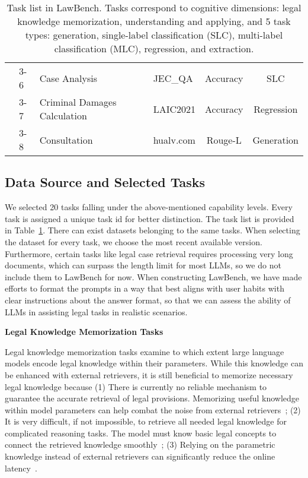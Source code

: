 \begin{table}[htbp]
{\begin{tabular}{llllcc}
          & 3-6 & Case Analysis & JEC\_QA & Accuracy &SLC\\
          & 3-7 & Criminal Damages Calculation & LAIC2021  & Accuracy &Regression \\
          & 3-8 & Consultation & hualv.com & Rouge-L &Generation\\
    \bottomrule
    \end{tabular}
    }
    \caption{\small Task list in LawBench. Tasks correspond to cognitive dimensions: legal knowledge memorization, understanding and applying, and 5 task types: generation, single-label classification (SLC), multi-label classification (MLC), regression, and extraction.}
  \label{tab:tasks}%
\end{table}%

\subsection{Data Source and Selected Tasks}
We selected 20 tasks falling under the above-mentioned capability levels. Every task is assigned a unique task id for better distinction. The task list is provided in Table~\ref{tab:tasks}. There can exist datasets belonging to the same tasks. When selecting the dataset for every task, we choose the most recent available version. Furthermore, certain tasks like legal case retrieval requires processing very long documents, which can surpass the length limit for most LLMs, so we do not include them to LawBench for now. When constructing LawBench, we have made efforts to format the prompts in a way that best aligns with user habits with clear instructions about the answer format, so that we can assess the ability of LLMs in assisting legal tasks in realistic scenarios.

\textbf{Legal Knowledge Memorization Tasks}

Legal knowledge memorization tasks examine to which extent large language models encode legal knowledge within their parameters. While this knowledge can be enhanced with external retrievers, it is still beneficial to memorize necessary legal knowledge because (1) There is currently no reliable mechanism to guarantee the accurate retrieval of legal provisions. Memorizing useful knowledge within model parameters can help combat the noise from external retrievers~\cite{xie2023adaptive,neeman2023disentqa}; (2) It is very difficult, if not impossible, to retrieve all needed legal knowledge for complicated reasoning tasks. The model must know basic legal concepts to connect the retrieved knowledge smoothly~\cite{shen2022product,ziems2023large,yu2023generate}; (3) Relying on the parametric knowledge instead of external retrievers can significantly reduce the online latency~\cite{shen2022semipqa,shen2022low,tay2022transformer}. 

